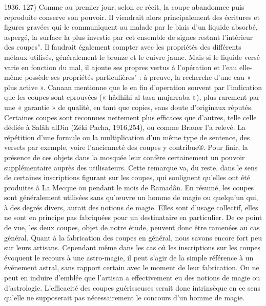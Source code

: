 1936. 127)
 Comme au premier jour, selon ce récit, la coupe abandonnee puis reproduite conserve son pouvoir.
Il viendrait alors principalement des écritures et figures gravées qui le communiquent au malade par le biais d'un liquide absorbé, aspergé, la surface la plus investie par cet ensemble de signes restant l'intérieur des coupes". Il faudrait également compter avec les propriétés des différents métaux utilisés, généralement le bronze et le cuivre jaune. Mais si le liquide versé varie en fonction du mal, il ajoute ses propres vertus à l'opération et l'eau elle-même possède ses propriétés particulières" : à preuve, la recherche d'une eau « plus active ». Canaan mentionne que le en fin d'operation
souvent par l'indication que les coupes sont eprouvées (« hâdhihi al-tasa mujarraba »), plus rarement par une « garantie » de qualité, en tant que copies, sans doute d'originaux réputés. Certaines coupes sont reconnues nettement plus efficaces que d'autres, telle celle dédiée à Salâh alDin (Zéki Pacha, 1916,254), ou comme Brauer l'a relevé. La répétition d'une formule ou la multiplication d'un même type de sentence, des versets par exemple, voire l'ancienneté des coupes y contribue®. Pour finir, la présence de ces objets dans la mosquée leur confère certainement un pouvoir supplémentaire auprès des utilisateurs. Cette remarque va, du reste, dans le sens de certaines inscriptions figurant sur les coupes, qui soulignent qu'elles ont été produites à La Mecque ou pendant le mois de Ramadân.
En résumé, les coupes sont généralement utilisées sans qu'œuvre un homme de magie ou quelqu'un qui, à des degrés divers, aurait des notions de magie. Elles sont d'usage collectif, elles ne sont en principe pas fabriquées pour un destinataire en particulier. De ce point de vue, les deux coupes, objet de notre étude, peuvent donc être ramenées au cas général.
Quant à la fabrication des coupes en général, nous savons encore fort peu sur leurs artisans. Cependant même dans les cas où les inscriptions sur les coupes évoquent le recours à une astro-magie, il peut s'agir de la simple référence à un événement astral, sans rapport certain avec le moment de leur fabrication. On ne peut en induire d'emblée que l'artisan a effectivement eu des notions de magie ou d'astrologie. L'efficacité des coupes guérisseuses serait donc intrinsèque en ce sens qu'elle ne supposerait pas nécessairement le concours d'un homme de magie.
